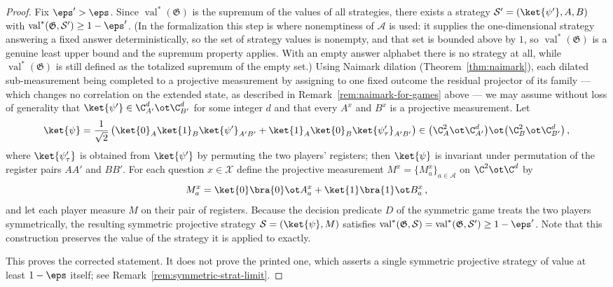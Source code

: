 \begin{proof}
	\leanok
	Fix $\eps' > \eps$. Since $\operatorname{val}^*(\mathfrak G)$ is the supremum of the values of all strategies, there exists a strategy $\mathcal S' = (\ket{\psi'}, A, B)$ with $\operatorname{val}^*(\mathfrak G, \mathcal S') \ge 1-\eps'$. (In the formalization this step is where nonemptiness of $\mathcal A$ is used: it supplies the one-dimensional strategy answering a fixed answer deterministically, so the set of strategy values is nonempty, and that set is bounded above by $1$, so $\operatorname{val}^*(\mathfrak G)$ is a genuine least upper bound and the supremum property applies. With an empty answer alphabet there is no strategy at all, while $\operatorname{val}^*(\mathfrak G)$ is still defined as the totalized supremum of the empty set.) Using Naimark dilation (Theorem~\ref{thm:naimark}), each dilated sub-measurement being completed to a projective measurement by assigning to one fixed outcome the residual projector of its family --- which changes no correlation on the extended state, as described in Remark~\ref{rem:naimark-for-games} above --- we may assume without loss of generality that $\ket{\psi'} \in \C^d_{A'} \ot \C^d_{B'}$ for some integer $d$ and that every $A^x$ and $B^x$ is a projective measurement. Let
	\[
		\ket{\psi} = \frac{1}{\sqrt 2}\, \bigl( \ket{0}_{A}\ket{1}_{B}\ket{\psi'}_{A'B'} + \ket{1}_{A}\ket{0}_{B}\ket{\psi'_\tau}_{A'B'} \bigr) \in \bigl(\C^2_{A} \ot \C^d_{A'}\bigr) \ot \bigl(\C^2_{B} \ot \C^d_{B'}\bigr)\,,
	\]
	where $\ket{\psi'_\tau}$ is obtained from $\ket{\psi'}$ by permuting the two players' registers; then $\ket{\psi}$ is invariant under permutation of the register pairs $AA'$ and $BB'$. For each question $x \in \mathcal X$ define the projective measurement $M^x = \{M^x_a\}_{a \in \mathcal A}$ on $\C^2 \ot \C^d$ by
	\[
		M^x_a = \ket{0}\bra{0} \ot A^x_a + \ket{1}\bra{1} \ot B^x_a\,,
	\]
	and let each player measure $M$ on their pair of registers. Because the decision predicate $D$ of the symmetric game treats the two players symmetrically, the resulting symmetric projective strategy $\mathcal S = (\ket{\psi}, M)$ satisfies $\operatorname{val}^*(\mathfrak G, \mathcal S) = \operatorname{val}^*(\mathfrak G, \mathcal S') \ge 1-\eps'$. Note that this construction preserves the value of the strategy it is applied to exactly.

	This proves the corrected statement. It does not prove the printed one, which asserts a single symmetric projective strategy of value at least $1-\eps$ itself; see Remark~\ref{rem:symmetric-strat-limit}.
\end{proof}

